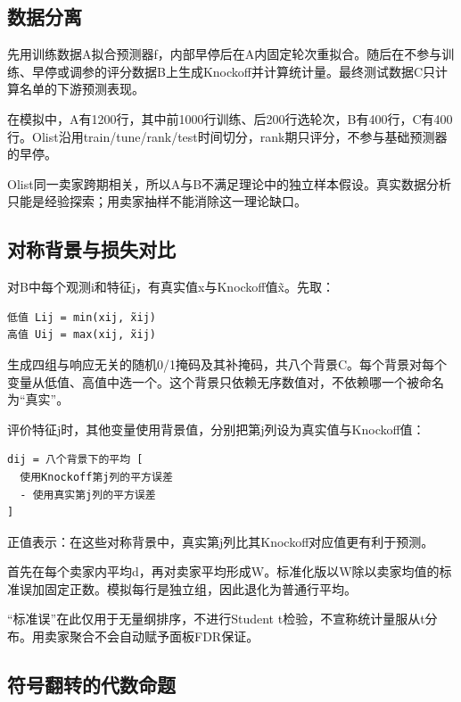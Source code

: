 \documentclass[UTF8,11pt,a4paper]{ctexart}
\begin{document}
\subsection{数据分离}\label{ux6570ux636eux5206ux79bb}

先用训练数据A拟合预测器f，内部早停后在A内固定轮次重拟合。随后在不参与训练、早停或调参的评分数据B上生成Knockoff并计算统计量。最终测试数据C只计算名单的下游预测表现。

在模拟中，A有1200行，其中前1000行训练、后200行选轮次，B有400行，C有400行。Olist沿用train/tune/rank/test时间切分，rank期只评分，不参与基础预测器的早停。

Olist同一卖家跨期相关，所以A与B不满足理论中的独立样本假设。真实数据分析只能是经验探索；用卖家抽样不能消除这一理论缺口。

\subsection{对称背景与损失对比}\label{ux5bf9ux79f0ux80ccux666fux4e0eux635fux5931ux5bf9ux6bd4}

对B中每个观测i和特征j，有真实值x与Knockoff值x̃。先取：

\begin{verbatim}
低值 Lij = min(xij, x̃ij)
高值 Uij = max(xij, x̃ij)
\end{verbatim}

生成四组与响应无关的随机0/1掩码及其补掩码，共八个背景C。每个背景对每个变量从低值、高值中选一个。这个背景只依赖无序数值对，不依赖哪一个被命名为``真实''。

评价特征j时，其他变量使用背景值，分别把第j列设为真实值与Knockoff值：

\begin{verbatim}
dij = 八个背景下的平均 [
  使用Knockoff第j列的平方误差
  - 使用真实第j列的平方误差
]
\end{verbatim}

正值表示：在这些对称背景中，真实第j列比其Knockoff对应值更有利于预测。

首先在每个卖家内平均d，再对卖家平均形成W。标准化版以W除以卖家均值的标准误加固定正数。模拟每行是独立组，因此退化为普通行平均。

``标准误''在此仅用于无量纲排序，不进行Student t检验，不宣称统计量服从t分布。用卖家聚合不会自动赋予面板FDR保证。

\subsection{符号翻转的代数命题}\label{ux7b26ux53f7ux7ffbux8f6cux7684ux4ee3ux6570ux547dux9898}
\end{document}
